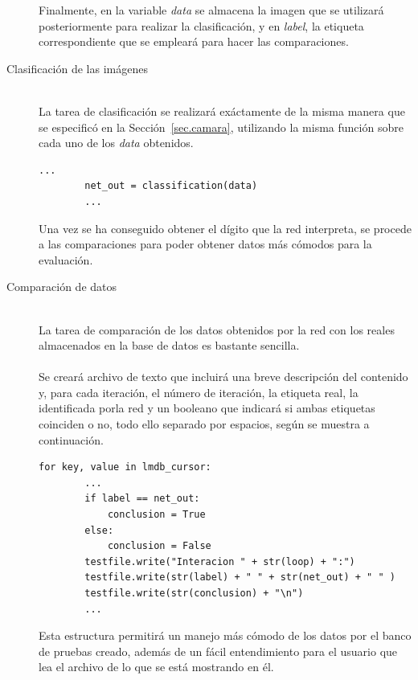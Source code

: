 \begin{description}
	Finalmente, en la variable \textit{data} se almacena la imagen que se utilizará posteriormente para realizar la clasificación, y en \textit{label}, la etiqueta correspondiente que se empleará para hacer las comparaciones.
	\vspace{5pt}
	\item[Clasificación de las imágenes] \hfill 
	\vspace{5pt}
	\\
	La tarea de clasificación se realizará exáctamente de la misma manera que se especificó en la Sección~\ref{sec.camara}, utilizando la misma función sobre cada uno de los \textit{data} obtenidos.
	\vspace{10pt}
	\begin{lstlisting}[frame=single]
		...
		net_out = classification(data)
		...
	\end{lstlisting}
	
	Una vez se ha conseguido obtener el dígito que la red interpreta, se procede a las comparaciones para poder obtener datos más cómodos para la evaluación.
	\vspace{5pt}
	\item[Comparación de datos] \hfill 
	\vspace{5pt}
	\\
	La tarea de comparación de los datos obtenidos por la red con los reales almacenados en la base de datos es bastante sencilla. \\
	\vspace{-10pt}
	\\
	Se creará archivo de texto que incluirá una breve descripción del contenido y, para cada iteración, el número de iteración, la etiqueta real, la identificada porla red y un booleano que indicará si ambas etiquetas coinciden o no, todo ello separado por espacios, según se muestra a continuación.
	\vspace{10pt}
	\begin{lstlisting}[frame=single]
	for key, value in lmdb_cursor:
		...
		if label == net_out:
			conclusion = True
		else:
			conclusion = False
		testfile.write("Interacion " + str(loop) + ":")
		testfile.write(str(label) + " " + str(net_out) + " " )
		testfile.write(str(conclusion) + "\n")
		...
	\end{lstlisting}
	
	Esta estructura permitirá un manejo más cómodo de los datos por el banco de pruebas creado, además de un fácil entendimiento para el usuario que lea el archivo de lo que se está mostrando en él.
\end{description}

